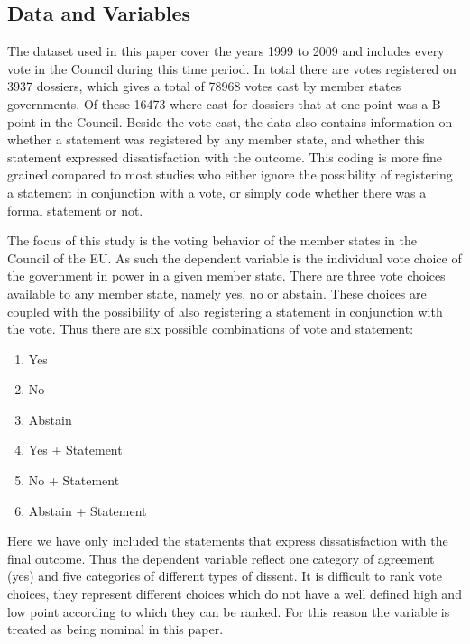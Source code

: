\subsection{Data and Variables}
The dataset used in this paper cover the years 1999 to 2009 and includes every vote in the Council during this time period. In total there are votes registered on 3937 dossiers, which gives a total of 78968 votes cast by member states governments. Of these 16473 where cast for dossiers that at one point was a B point in the Council. Beside the vote cast, the data also contains information on whether a statement was registered by any member state, and whether this statement expressed dissatisfaction with the outcome. This coding is more fine grained compared to most studies who either ignore the possibility of registering a statement in conjunction with a vote, or simply code whether there was a formal statement or not.

The focus of this study is the voting behavior of the member states in the Council of the EU. As such the dependent variable is the individual vote choice of the government in power in a given member state. There are three vote choices available to any member state, namely yes, no or abstain. These choices are coupled with the possibility of also registering a statement in conjunction with the vote. Thus there are six possible combinations of vote and statement:

\begin{enumerate}
\item Yes
\item No
\item Abstain
\item Yes + Statement
\item No + Statement
\item Abstain + Statement
\end{enumerate}

Here we have only included the statements that express dissatisfaction with the final outcome. Thus the dependent variable reflect one category of agreement (yes) and five categories of different types of dissent. It is difficult to rank vote choices, they represent different choices which do not have a well defined high and low point according to which they can be ranked. For this reason the variable is treated as being nominal in this paper. 

